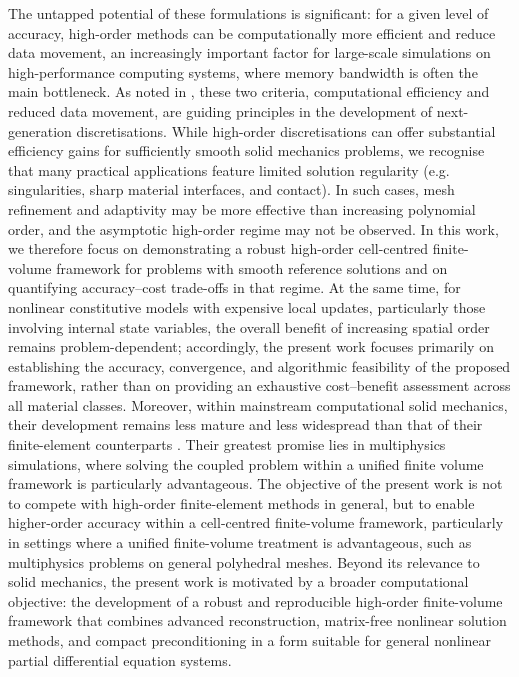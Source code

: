 \documentclass[review,3p]{elsarticle}
\begin{document}
 The untapped potential of these formulations is significant: for a given level of accuracy, high-order methods can be computationally more efficient and reduce data movement, an increasingly important factor for large-scale simulations on high-performance computing systems, where memory bandwidth is often the main bottleneck. As noted in \cite{Tzanio2021}, these two criteria, computational efficiency and reduced data movement, are guiding principles in the development of next-generation discretisations. {\color{orange}While high-order discretisations can offer substantial efficiency gains for sufficiently smooth solid mechanics problems, we recognise that many practical applications feature limited solution regularity (e.g. singularities, sharp material interfaces, and contact). In such cases, mesh refinement and adaptivity may be more effective than increasing polynomial order, and the asymptotic high-order regime may not be observed. In this work, we therefore focus on demonstrating a robust high-order cell-centred finite-volume framework for problems with smooth reference solutions and on quantifying accuracy–cost trade-offs in that regime.} {\color{orange}At the same time, for nonlinear constitutive models with expensive local updates, particularly those involving internal state variables, the overall benefit of increasing spatial order remains problem-dependent; accordingly, the present work focuses primarily on establishing the accuracy, convergence, and algorithmic feasibility of the proposed framework, rather than on providing an exhaustive cost--benefit assessment across all material classes.} 
%
%
{\color{orange}Moreover, within mainstream computational solid mechanics, their development remains less mature and less widespread than that of their finite-element counterparts} \cite{Bathe1996}. Their greatest promise lies in multiphysics simulations, where solving the coupled problem within a unified finite volume framework is particularly advantageous. {\color{orange}The objective of the present work is not to compete with high-order finite-element methods in general, but to enable higher-order accuracy within a cell-centred finite-volume framework, particularly in settings where a unified finite-volume treatment is advantageous, such as multiphysics problems on general polyhedral meshes.} {\color{orange}Beyond its relevance to solid mechanics, the present work is motivated by a broader computational objective: the development of a robust and reproducible high-order finite-volume framework that combines advanced reconstruction, matrix-free nonlinear solution methods, and compact preconditioning in a form suitable for general nonlinear partial differential equation systems.}
\end{document}
